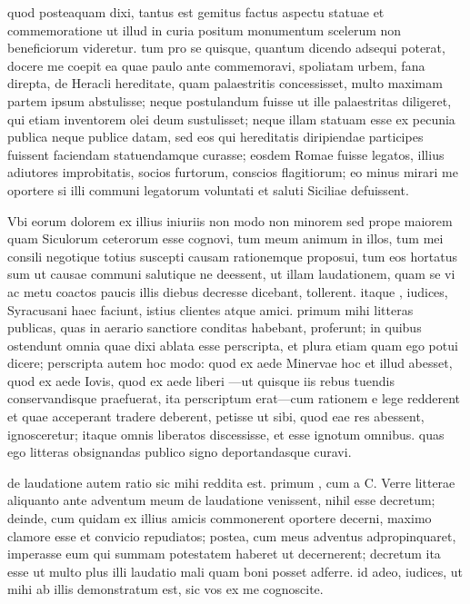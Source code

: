  quod posteaquam dixi, tantus est gemitus factus aspectu statuae et commemoratione ut illud in curia positum monumentum scelerum non beneficiorum videretur. tum pro se quisque, quantum dicendo adsequi poterat, docere me coepit ea quae paulo ante commemoravi, spoliatam urbem, fana direpta, de Heracli hereditate, quam palaestritis concessisset, multo maximam partem ipsum abstulisse; neque postulandum fuisse ut ille palaestritas diligeret, qui etiam inventorem olei deum sustulisset; neque illam statuam esse ex pecunia publica neque publice datam, sed eos qui hereditatis diripiendae participes fuissent faciendam statuendamque curasse; eosdem Romae fuisse legatos, illius adiutores improbitatis, socios furtorum, conscios flagitiorum; eo minus mirari me oportere si illi communi legatorum voluntati et saluti Siciliae defuissent.

 Vbi eorum dolorem ex illius iniuriis non modo non minorem sed prope maiorem quam Siculorum ceterorum esse cognovi, tum meum animum in illos, tum mei consili negotique totius suscepti causam rationemque proposui, tum eos hortatus sum ut causae communi salutique ne deessent, ut illam laudationem, quam se vi ac metu coactos paucis illis diebus decresse dicebant, tollerent. itaque , iudices, Syracusani haec faciunt, istius clientes atque amici. primum mihi litteras publicas, quas in aerario sanctiore conditas habebant, proferunt; in quibus ostendunt omnia quae dixi ablata esse perscripta, et plura etiam quam ego potui dicere; perscripta autem hoc modo: quod ex aede Minervae hoc et illud abesset, quod ex aede Iovis, quod ex aede liberi —ut quisque iis rebus tuendis conservandisque praefuerat, ita perscriptum erat—cum rationem e lege redderent et quae acceperant tradere deberent, petisse ut sibi, quod eae res abessent, ignosceretur; itaque omnis liberatos discessisse, et esse ignotum omnibus. quas ego litteras obsignandas publico signo deportandasque curavi.

 de laudatione autem ratio sic mihi reddita est. primum , cum a C. Verre litterae aliquanto ante adventum meum de laudatione venissent, nihil esse decretum; deinde, cum quidam ex illius amicis commonerent oportere decerni, maximo clamore esse et convicio repudiatos; postea, cum meus adventus adpropinquaret, imperasse eum qui summam potestatem haberet ut decernerent; decretum ita esse ut multo plus illi laudatio mali quam boni posset adferre. id adeo, iudices, ut mihi ab illis demonstratum est, sic vos ex me cognoscite.


